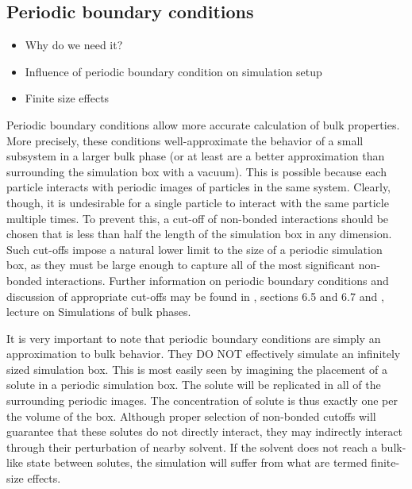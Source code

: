 \documentclass[9pt,bestpractices]{livecoms}
\begin{document}
\subsection{Periodic boundary conditions}
\begin{itemize}
\item Why do we need it?
\item Influence of periodic boundary condition on simulation setup
\item Finite size effects
\end{itemize}


Periodic boundary conditions allow more accurate calculation of bulk properties. 
More precisely, these conditions well-approximate the behavior of a small subsystem in a larger bulk phase (or at least are a better approximation than surrounding the simulation box with a vacuum). 
This is possible because each particle interacts with periodic images of particles in the same system. 
Clearly, though, it is undesirable for a single particle to interact with the same particle multiple times. 
To prevent this, a cut-off of non-bonded interactions should be chosen that is less than half the length of the simulation box in any dimension. 
Such cut-offs impose a natural lower limit to the size of a periodic simulation box, as they must be large enough to capture all of the most significant non-bonded interactions. 
Further information on periodic boundary conditions and discussion of appropriate cut-offs may be found in \citet{LeachBook}, sections 6.5 and 6.7 and \citet{ShellNotes}, lecture on Simulations of bulk phases.

It is very important to note that periodic boundary conditions are simply an approximation to bulk behavior. 
They DO NOT effectively simulate an infinitely sized simulation box. 
This is most easily seen by imagining the placement of a solute in a periodic simulation box. 
The solute will be replicated in all of the surrounding periodic images. 
The concentration of solute is thus exactly one per the volume of the box. 
Although proper selection of non-bonded cutoffs will guarantee that these solutes do not directly interact, they may indirectly interact through their perturbation of nearby solvent. 
If the solvent does not reach a bulk-like state between solutes, the simulation will suffer from what are termed finite-size effects. 
\end{document}
